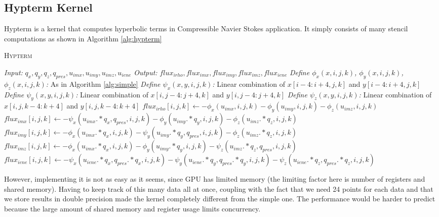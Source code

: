 \subsection{Hypterm Kernel}
Hypterm is a kernel that computes hyperbolic terms in Compressible Navier Stokes application. It simply consists of many stencil computations as shown in Algorithm \ref{alg:hypterm}
\begin{algorithm}
\caption{\textsc{Hypterm}}
\label{alg:hypterm}
\begin{algorithmic}[1]
\State \emph{Input:} $q_x, q_y, q_z, q_{pres}, u_{imx}, u_{imy}, u_{imz}, u_{iene}$
\State \emph{Output:} $flux_{irho}, flux_{imx}, flux_{imy}, flux_{imz}, flux_{iene}$
\State \emph{Define $\phi_x(x,i,j,k)$, $\phi_y(x,i,j,k)$, $\phi_z(x,i,j,k)$:} As in Algorithm \ref{alg:simple}
\State \emph{Define $\psi_x(x,y,i,j,k)$:} Linear combination of $x[i-4:i+4,j,k]$ and $y[i-4:i+4,j,k]$
\State \emph{Define $\psi_y(x,y,i,j,k)$:} Linear combination of $x[i,j-4:j+4,k]$ and $y[i,j-4:j+4,k]$
\State \emph{Define $\psi_z(x,y,i,j,k)$:} Linear combination of $x[i,j,k-4:k+4]$ and $y[i,j,k-4:k+4]$
	\State $flux_{irho}[i,j,k] \leftarrow -\phi_x(u_{imx},i,j,k) - \phi_y(u_{imy},i,j,k) - \phi_z(u_{imz},i,j,k)$
	\State $flux_{imx}[i,j,k] \leftarrow -\psi_x(u_{imx}.*q_x,q_{pres}, i,j,k) - \phi_y(u_{imy}.*q_y,i,j,k) - \phi_z(u_{imz}.*q_z,i,j,k)$
	\State $flux_{imy}[i,j,k] \leftarrow -\phi_x(u_{imx}.*q_x,i,j,k) - \psi_y(u_{imy}.*q_y,q_{pres},i,j,k) - \phi_z(u_{imz}.*q_z,i,j,k)$
	\State $flux_{imz}[i,j,k] \leftarrow -\phi_x(u_{imx}.*q_x,i,j,k) - \phi_y(u_{imy}.*q_y,i,j,k) - \psi_z(u_{imz}.*q_z,q_{pres},i,j,k)$
	\State $flux_{iene}[i,j,k] \leftarrow -\psi_x(u_{iene}.*q_x,q_{pres}.*q_x,i,j,k) - \psi_y(u_{iene}.*q_y,q_{pres}.*q_y,i,j,k) - \psi_z(u_{iene}.*q_z,q_{pres}.*q_z,i,j,k)$
\EndFor
\end{algorithmic}
\end{algorithm}

However, implementing it is not as easy as it seems, since GPU has limited memory (the limiting factor here is number of registers and shared memory). Having to keep track of this many data all at once, coupling with the fact that we need 24 points for each data and that we store results in double precision made the kernel completely different from the simple one. The performance would be harder to predict because the large amount of shared memory and register usage limits concurrency.

